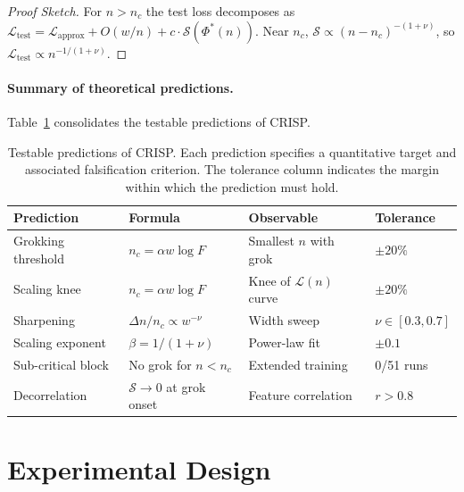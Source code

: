 \documentclass{article}
\newcommand{\nc}{n_c}
\newcommand{\loss}{\mathcal{L}}
\newcommand{\supidx}{\mathcal{S}}
\newcommand{\Fnum}{F}
\begin{document}
\begin{proof}[Proof Sketch]
For $n > \nc$ the test loss decomposes as $\loss_{\text{test}} = \loss_{\text{approx}} + O(w/n) + c \cdot \supidx(\Phi^*(n))$. Near $\nc$, $\supidx \propto (n - \nc)^{-(1+\nu)}$, so $\loss_{\text{test}} \propto n^{-1/(1+\nu)}$.
\end{proof}

\paragraph{Summary of theoretical predictions.}
Table~\ref{tab:predictions} consolidates the testable predictions of CRISP.

\begin{table}[t]
\centering
\caption{Testable predictions of CRISP. Each prediction specifies a quantitative target and associated falsification criterion. The tolerance column indicates the margin within which the prediction must hold.}
\label{tab:predictions}
\vspace{0.5em}
\begin{tabular}{@{}llll@{}}
\toprule
\textbf{Prediction} & \textbf{Formula} & \textbf{Observable} & \textbf{Tolerance} \\
\midrule
Grokking threshold & $\nc = \alpha w \log \Fnum$ & Smallest $n$ with grok & $\pm 20\%$ \\
Scaling knee & $\nc = \alpha w \log \Fnum$ & Knee of $\loss(n)$ curve & $\pm 20\%$ \\
Sharpening & $\Delta n / \nc \propto w^{-\nu}$ & Width sweep & $\nu \in [0.3, 0.7]$ \\
Scaling exponent & $\beta = 1/(1+\nu)$ & Power-law fit & $\pm 0.1$ \\
Sub-critical block & No grok for $n < \nc$ & Extended training & 0/51 runs \\
Decorrelation & $\supidx \to 0$ at grok onset & Feature correlation & $r > 0.8$ \\
\bottomrule
\end{tabular}
\end{table}


\section{Experimental Design}
\label{sec:experiments}
\end{document}

